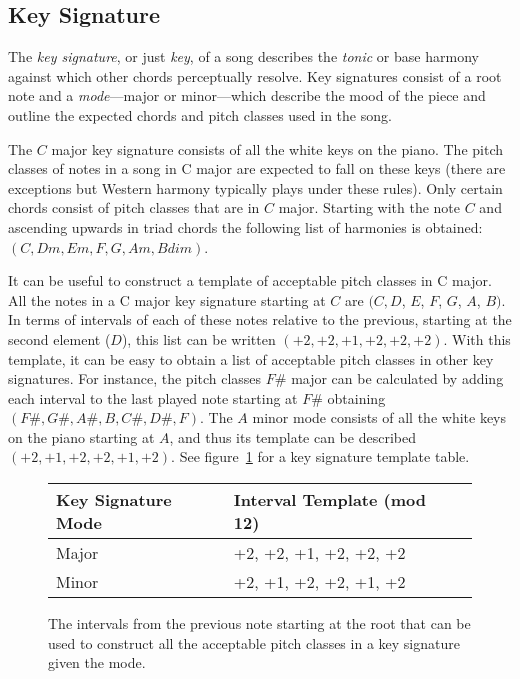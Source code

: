 \subsection{Key Signature}

The \textit{key signature}, or just \textit{key}, of a song describes the \textit{tonic} or base harmony against which other chords perceptually resolve. Key signatures consist of a root note and a \textit{mode}---major or minor---which describe the mood of the piece and outline the expected chords and pitch classes used in the song.

The $C$ major key signature consists of all the white keys on the piano. The pitch classes of notes in a song in C major are expected to fall on these keys (there are exceptions but Western harmony typically plays under these rules). Only certain chords consist of pitch classes that are in $C$ major. Starting with the note $C$ and ascending upwards in triad chords the following list of harmonies is obtained: $(C, Dm, Em, F, G, Am, Bdim)$.

It can be useful to construct a template of acceptable pitch classes in C major. All the notes in a C major key signature starting at $C$ are $(C, D$, $E$, $F$, $G$, $A$, $B)$. In terms of intervals of each of these notes relative to the previous, starting at the second element ($D$), this list can be written $(+2, +2, +1, +2, +2, +2)$. With this template, it can be easy to obtain a list of acceptable pitch classes in other key signatures. For instance, the pitch classes $F\#$ major can be calculated by adding each interval to the last played note starting at $F\#$ obtaining $(F\#,G\#,A\#,B,C\#,D\#,F)$. The $A$ minor mode consists of all the white keys on the piano starting at $A$, and thus its template can be described $(+2,+1,+2,+2,+1,+2)$. See figure~\ref{fig:keysig} for a key signature template table.

\begin{figure}[h]
\centering
\begin{tabular}{lll}
\toprule
Key Signature Mode        & Interval Template (mod 12) \\
\midrule
Major       & +2, +2, +1, +2, +2, +2 \\
Minor       & +2, +1, +2, +2, +1, +2 \\
\bottomrule
\end{tabular}
\caption[Key Signature Mode Intervals]{The intervals from the previous note starting at the root that can be used to construct all the acceptable pitch classes in a key signature given the mode.}
\label{fig:keysig}
\end{figure}
